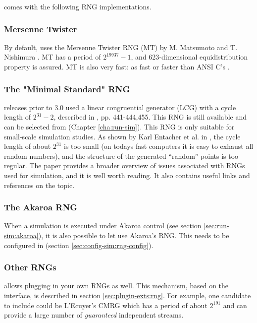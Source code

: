 {\opp} comes with the following RNG implementations.

\subsubsection{Mersenne Twister}
\label{sec:sim-lib:mersenne-twister}

By default, {\opp} uses the Mersenne Twister RNG (MT) by M. Matsumoto and
T. Nishimura \cite{Matsumoto98}. MT has a period of $2^{19937}-1$,
and 623-dimensional equidistribution property is assured. MT is
also very fast: as fast or faster than ANSI C's .

\subsubsection{The "Minimal Standard" RNG}
\label{sec:sim-lib:minimal-standard-rng}

{\opp} releases prior to 3.0 used a linear congruential generator
(LCG) with a cycle length of $2^{31}-2$, described in
\cite{Jain91}, pp. 441-444,455. This RNG is still available
and can be selected from  (Chapter \ref{cha:run-sim}).
This RNG is only suitable for small-scale simulation studies.
As shown by Karl Entacher et al. in \cite{Entacher02},
the cycle length of about $2^{31}$ is too small (on todays
fast computers it is easy to exhaust all random numbers), and
the structure of the generated ``random'' points is too regular.
The \cite{Hellekalek98} paper provides a broader overview of issues
associated with RNGs used for simulation, and it is well worth reading.
It also contains useful links and references on the topic.

\subsubsection{The Akaroa RNG}
\label{sec:sim-lib:akaroa-rng}

When a simulation is executed under Akaroa control (see section
\ref{sec:run-sim:akaroa}), it is also possible to let {\opp} use Akaroa's
RNG. This needs to be configured in  (section
\ref{sec:config-sim:rng-config}).

\subsubsection{Other RNGs}
\label{sec:sim-lib:other-rngs}

{\opp} allows plugging in your own RNGs as well. This mechanism,
based on the  interface, is described in section
\ref{sec:plugin-exts:rng}.
For example, one candidate to include could be L'Ecuyer's CMRG \cite{LEcuyer02}
which has a period of about $2^{191}$ and can provide a large
number of \textit{guaranteed} independent streams.


